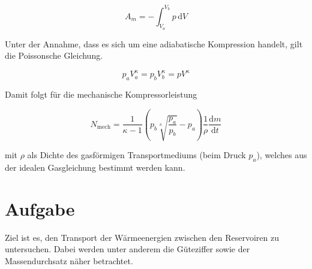 \begin{equation}
A_m = - \int_{V_a}^{V_b} p \, \mathrm{d}V
\end{equation}

Unter der Annahme, dass es sich um eine adiabatische Kompression handelt, gilt die Poissonsche Gleichung.

\begin{equation}
p_a V_a^{\kappa} = p_b V_b^{\kappa} = pV^{\kappa}
\end{equation}

Damit folgt für die mechanische Kompressorleistung


\begin{equation}
\label{eqn:mechleistung}
N_\text{mech} = \frac{1}{\kappa-1}\left(p_b \sqrt[\kappa]{\frac{p_a}{p_b}}-p_a\right)\frac{1}{\rho} \frac{\mathrm{d}m} {\mathrm{d}t}
\end{equation}

mit $\rho$ als Dichte des gasförmigen Transportmediums (beim Druck $p_a$), welches aus der idealen Gasgleichung bestimmt werden kann.

\section{Aufgabe}
\label{sec:Aufgabe}
Ziel ist es, den Transport der Wärmeenergien zwischen den Reservoiren zu untersuchen. Dabei werden unter anderem die Güteziffer sowie der Massendurchsatz näher betrachtet.
